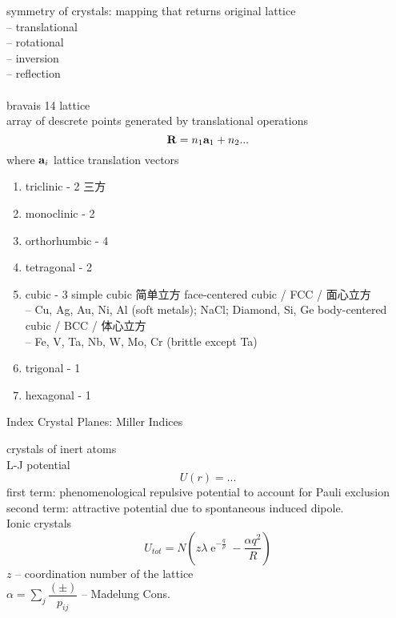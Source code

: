 \documentclass[UTF8]{ctexart} %
\DeclareMathOperator{\e}{\mathrm{e}}
\newcommand{\dis}{\displaystyle}
\numberwithin{equation}{section}
\begin{document}
symmetry of crystals: mapping that returns original lattice\\
-- translational\\
-- rotational\\
-- inversion\\
-- reflection\\
~\\
bravais 14 lattice\\
array of descrete points generated by translational operations
\begin{equation}\label{key}
\vb{R} = n_1\vb{a}_1 + n_2 ...
\end{equation}
where $ \vb{a}_i $ lattice translation vectors
\begin{enumerate}
	\item triclinic - 2 三方
	\item monoclinic - 2
	\item orthorhumbic - 4
	\item tetragonal - 2
	\item cubic - 3
		\subitem simple cubic 简单立方
		\subitem face-centered cubic / FCC / 面心立方\\
		 		-- Cu, Ag, Au, Ni, Al (soft metals); NaCl; Diamond, Si, Ge
		\subitem body-centered cubic / BCC / 体心立方\\
				-- Fe, V, Ta, Nb, W, Mo, Cr (brittle except Ta)
	\item trigonal - 1
	\item hexagonal - 1
\end{enumerate}

Index Crystal Planes: Miller Indices

crystals of inert atoms\\
L-J potential\\
\begin{equation}\label{key}
U(r) = ...
\end{equation}
first term: phenomenological repulsive potential to account for Pauli exclusion\\
second term: attractive potential due to spontaneous induced dipole.\\

Ionic crystals\\
\begin{equation}\label{key}
U_{tot} = N(z\lambda\e^{-\tfrac{q}{\rho}} - \dfrac{\alpha q^2}{R})
\end{equation}
$ z $ -- coordination number of the lattice\\
$ \alpha = \dis\sum_j \dfrac{(\pm)}{p_{ij}} $ -- Madelung Cons.
\end{document}
